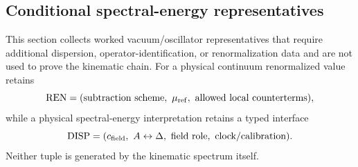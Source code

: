 \documentclass[11pt,a4paper]{article}
\begin{document}
\subsection{Conditional spectral-energy representatives}
\label{p2d:app:oscillator-examples}
This section collects worked vacuum/oscillator representatives that require
additional dispersion, operator-identification, or renormalization data and
are not used to prove the kinematic chain.  For a
physical continuum renormalized value retains
\[
 \mathrm{REN}=(\text{subtraction scheme},\ \mu_{\rm ref},\
 \text{allowed local counterterms}),
\]
while a physical spectral-energy interpretation retains a typed interface
\[
 \mathrm{DISP}=(c_{\rm field},\ A\leftrightarrow\Delta,\
 \text{field role},\ \text{clock/calibration}).
\]
Neither tuple is generated by the kinematic spectrum itself.
\end{document}
